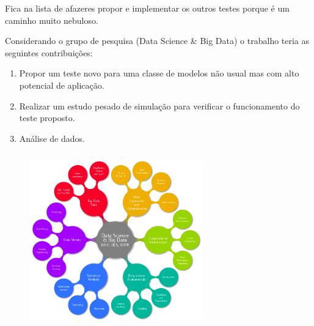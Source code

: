 \documentclass[10pt,
  aspectratio=169,
  serif,
  mathserif,
  professionalfont,
  compress,
  handout,
  ]{beamer}\usepackage[]{graphicx}\usepackage[]{color}
\begin{document}
\begin{frame}[c, allowframebreaks]
Fica na lista de afazeres propor e implementar os outros testes porque é um caminho muito nebuloso.

\framebreak

Considerando o grupo de pesquisa (Data Science \& Big Data) o trabalho teria as seguintes contribuições:

\begin{enumerate}
  \item Propor um teste novo para uma classe de modelos não usual mas com alto potencial de aplicação.
  \item Realizar um estudo pesado de simulação para verificar o funcionamento do teste proposto.
  \item Análise de dados.
\end{enumerate}

\framebreak

\begin{figure}[t]
\includegraphics[width=7.5cm, height=7.5cm]{img/dsbd2_t.png}
\centering
\end{figure}



\end{frame}
\end{document}
